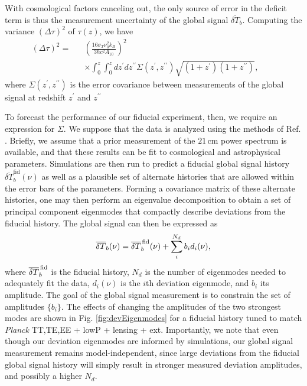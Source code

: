 \documentclass[twocolumn,aps,prd,nofootinbib,showpacs]{revtex4-1}
\begin{document}
With cosmological factors canceling out, the only source of error in the deficit term is thus the measurement uncertainty of the global signal $\overline{\delta T}_b$. Computing the variance $(\Delta \tau)^2$ of $\tau(z)$, we have
\begin{eqnarray}
\label{eq:DeltaTauDoubleIntegral}
(\Delta \tau)^2 = &&\left( \frac{16 \sigma_T \nu_0^2 k_B}{3 \hbar c^2 A_{10}} \right)^2 \nonumber \\
&&\times \int_0^z \! \!\int_0^z dz^\prime dz^{\prime \prime} \Sigma (z^\prime, z^{\prime \prime}) \sqrt{(1+z^\prime) (1+z^{\prime \prime})}, \qquad
\end{eqnarray}
where $\Sigma (z^\prime, z^{\prime \prime})$ is the error covariance between measurements of 
the global signal at redshift $z^\prime$ and $z^{\prime \prime}$

To forecast the performance of our fiducial experiment, then, we require an expression for $\Sigma$. We suppose that the data is analyzed using the methods of Ref. \cite{Liu_in_prep}. Briefly, we assume that a prior measurement of the $21\,\textrm{cm}$ power spectrum is available, and that these results can be fit to cosmological and astrophysical parameters. Simulations are then run to predict a fiducial global signal history $\overline{\delta T}_b^\textrm{fid} (\nu)$ as well as a plausible set of alternate histories that are allowed within the error bars of the parameters. Forming a covariance matrix of these alternate histories, one may then perform an eigenvalue decomposition to obtain a set of principal component eigenmodes that compactly describe deviations from the fiducial history. The global signal can then be expressed as
\begin{equation}
\overline{\delta T}_b (\nu) = \overline{\delta T}_b^\textrm{\,fid} (\nu) + \sum_i^{N_d} b_i d_i (\nu),
\end{equation}
where $\overline{\delta T}_b^\textrm{\,fid}$ is the fiducial history, $N_d$ is the number of eigenmodes needed to adequately fit the data, $d_i (\nu)$ is the $i$th deviation eigenmode, and $b_i$ its amplitude. The goal of the global signal measurement is to constrain the set of amplitudes $\{ b_i \}$. The effects of changing the amplitudes of the two strongest modes are shown in Fig. \ref{fig:devEigenmodes} for a fiducial history tuned to match \emph{Planck} TT,TE,EE + lowP + lensing + ext. Importantly, we note that even though our deviation eigenmodes are informed by simulations, our global signal measurement remains model-independent, since large deviations from the fiducial global signal history will simply result in stronger measured deviation amplitudes, and possibly a higher $N_d$.
\end{document}
